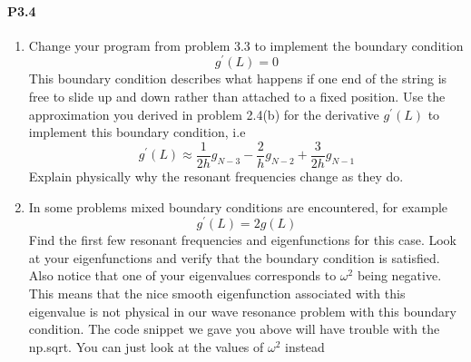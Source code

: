 \paragraph*{P3.4}
\begin{enumerate}[label=(\alph*)]
	\item Change your program from problem 3.3 to implement the boundary
condition  \begin{equation*}
		g^\prime(L) = 0
				\end{equation*}
				This boundary condition describes what happens if one end of the
string is free to slide up and down rather than attached to a fixed
position. Use the approximation you derived in problem 2.4(b) for the
derivative $g^\prime(L)$ to implement this boundary condition, i.e
\begin{equation*}
		g^\prime(L) \approx \frac{1}{2h}g_{N-3} - \frac{2}{h}g_{N-2} + \frac{3}{2h}g_{N-1}
				\end{equation*}Explain physically why the resonant frequencies change as they do.
				\item In some problems mixed boundary conditions are encountered, for
example\begin{equation*}
		g^\prime(L) = 2g(L)
				\end{equation*}Find the first few resonant frequencies and eigenfunctions for this
case. Look at your eigenfunctions and verify that the boundary condition is satisfied. Also notice that one of your eigenvalues corresponds
to $\omega^2$ being negative. This means that the nice smooth eigenfunction
associated with this eigenvalue is not physical in our wave resonance
problem with this boundary condition. The code snippet we gave you
above will have trouble with the np.sqrt. You can just look at the
values of $\omega^2$ instead
\end{enumerate}